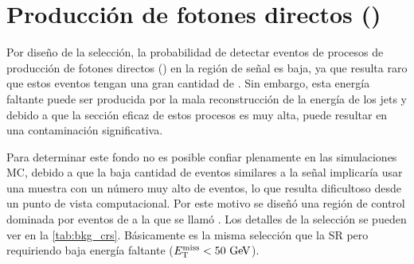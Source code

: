 \section{Producción de fotones directos (\gjet)}
\label{sec:bkg_gjet}

Por diseño de la selección, la probabilidad de detectar eventos de procesos de producción de fotones
directos ({\gjet}) en la región de señal es
baja, ya que resulta raro que estos eventos tengan una gran cantidad de {\met}.
Sin embargo, esta energía faltante puede ser producida por la mala
reconstrucción de la energía de los jets y debido a que la sección eficaz de
estos procesos es muy alta, puede resultar en una contaminación significativa.

Para determinar este fondo no es posible confiar plenamente en las simulaciones
MC, debido a que la baja cantidad de eventos similares a la señal implicaría
usar una muestra con un número muy alto de eventos, lo que resulta dificultoso desde un
punto de vista computacional. Por este motivo se diseñó
una región de control dominada por eventos de {\gjet} a la que se llamó {\CRQ}.
Los detalles de la selección se pueden ver en la \cref{tab:bkg_crs}. Básicamente
es la misma selección que la SR pero requiriendo baja energía faltante ($\met <
50 \gev$).



